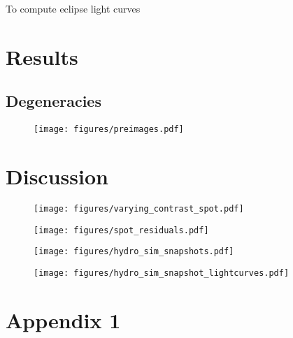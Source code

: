 \documentclass[modern]{aastex631}
\begin{document}
To compute eclipse light curves 
\section{Results}
\label{sec:results}

\subsection{Degeneracies}
\label{ssec:degeneracies}


\begin{figure}[t!]
    \begin{centering}
    \texttt{[image: figures/preimages.pdf]}
    \caption{}
    \label{fig:preimages}
    \end{centering}
\end{figure}





\section{Discussion}
\label{sec:discussion}

\begin{figure}[t!]
    \begin{centering}
    \texttt{[image: figures/varying\_contrast\_spot.pdf]}
    \caption{}
    \label{fig:varying_contrast_spot}
    \end{centering}
\end{figure}

\begin{figure}[t!]
    \begin{centering}
    \texttt{[image: figures/spot\_residuals.pdf]}
    \caption{}
    \label{fig:spot_residuals}
    \end{centering}
\end{figure}

\begin{figure}[t!]
    \begin{centering}
    \texttt{[image: figures/hydro\_sim\_snapshots.pdf]}
    \caption{}
    \label{fig:hydro_sim_snapshots:maps}
    \end{centering}
\end{figure}

\begin{figure}[t!]
    \begin{centering}
    \texttt{[image: figures/hydro\_sim\_snapshot\_lightcurves.pdf]}
    \caption{}
    \label{fig:hydro_sim_snapshots:lightcurves}
    \end{centering}
\end{figure}






\appendix
\section{Appendix 1}
\clearpage
\end{document}
